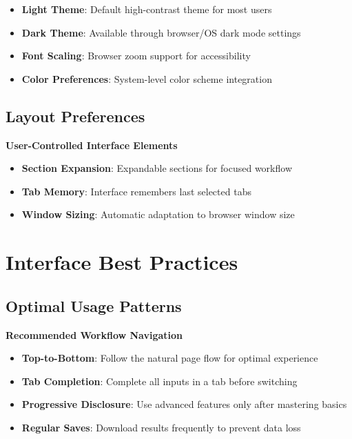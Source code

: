 \begin{itemize}
    \item \textbf{Light Theme}: Default high-contrast theme for most users
    \item \textbf{Dark Theme}: Available through browser/OS dark mode settings
    \item \textbf{Font Scaling}: Browser zoom support for accessibility
    \item \textbf{Color Preferences}: System-level color scheme integration
\end{itemize}

\subsection{Layout Preferences}

\textbf{User-Controlled Interface Elements}

\begin{itemize}
    \item \textbf{Section Expansion}: Expandable sections for focused workflow
    \item \textbf{Tab Memory}: Interface remembers last selected tabs
    \item \textbf{Window Sizing}: Automatic adaptation to browser window size
\end{itemize}

\section{Interface Best Practices}

\subsection{Optimal Usage Patterns}

\textbf{Recommended Workflow Navigation}

\begin{itemize}
    \item \textbf{Top-to-Bottom}: Follow the natural page flow for optimal experience
    \item \textbf{Tab Completion}: Complete all inputs in a tab before switching
    \item \textbf{Progressive Disclosure}: Use advanced features only after mastering basics
    \item \textbf{Regular Saves}: Download results frequently to prevent data loss
\end{itemize}

